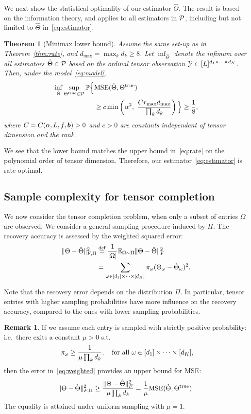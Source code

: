 \documentclass{article}
\theoremstyle{plain}
\newtheorem{thm}{Theorem}[section]
\theoremstyle{definition}
\newtheorem{rmk}{Remark}
\begin{document}
We next show the statistical optimality of our estimator $\hat \Theta$. The result is based on the information theory, and applies to all estimators in $\mathcal{P}$, including but not limited to $\hat \Theta$ in~\eqref{eq:estimator}.

\begin{thm}[Minimax lower bound]\label{thm:minimax}
Assume the same set-up as in Theorem~\ref{thm:rate}, and $d_{\max}=\max_k d_k \geq 8$. Let $\inf_{\hat \Theta}$ denote the infimum over all estimators $\hat \Theta\in\mathcal{P}$ based on the ordinal tensor observation $\mathcal{Y}\in[L]^{d_1\times \cdots \times d_K}$. Then, under the model~\eqref{eq:model},
\begin{align}\label{eq:lower}
\inf_{\hat \Theta }\sup_{\Theta^{\text{true}}\in\mathcal{P}} \mathbb{P}\Big\{& \text{MSE}(\hat \Theta, \Theta^{\text{true}}) \\
& \geq c\min\left( \alpha^2, \ { Cr_{\max}d_{\max} \over \prod_k d_k} \right) \Big\} \geq {1\over 8},
\end{align}
where $C=C(\alpha, L, f,\bm{b})>0$ and $c>0$ are constants independent of tensor dimension and the rank.
\end{thm}
We see that the lower bound matches the upper bound in~\eqref{eq:rate} on the polynomial order of tensor dimension. Therefore, our estimator~\eqref{eq:estimator} is rate-optimal.

\subsection{Sample complexity for tensor completion}
We now consider the tensor completion problem, when only a subset of entries $\Omega$ are observed. We consider a general sampling procedure induced by $\Pi$. The recovery accuracy is assessed by the weighted squared error:
\begin{align}\label{eq:weighted}
\lVert\Theta-\hat \Theta\rVert_{F,\Pi}^2&\stackrel{\text{def}}{=}
{1\over |\Omega|}\mathbb{E}_{\Omega\sim \Pi}\lVert\Theta-\hat \Theta\rVert_F^2\notag \\
&=\sum_{\omega\in[d_1]\times \cdots \times [d_K]} \pi_{\omega}(\Theta_{\omega}-\hat \Theta_{\omega})^2.
\end{align}

Note that the recovery error depends on the distribution $\Pi$. In particular, tensor entries with higher sampling probabilities have more influence on the recovery accuracy, compared to the ones with lower sampling probabilities.
\begin{rmk} If we assume each entry is sampled with strictly positive probability; i.e.\ there exits a constant $\mu> 0$ s.t.
\[
\ \pi_\omega\geq {1\over \mu \prod_k d_k},\quad \text{for all}\ \omega\in[d_1]\times\cdots \times [d_K],
\]
then the error in~\eqref{eq:weighted} provides an upper bound for MSE:
\[
\lVert\Theta-\hat \Theta\rVert_{F,\Pi}^2 \geq {\lVert\Theta-\hat \Theta\rVert_F^2\over \mu \prod_kd_k}={1\over \mu}\text{MSE}(\hat \Theta, \Theta^{\text{true}}).
\]
The equality is attained under uniform sampling with $\mu=1$.
\end{rmk}
\end{document}
